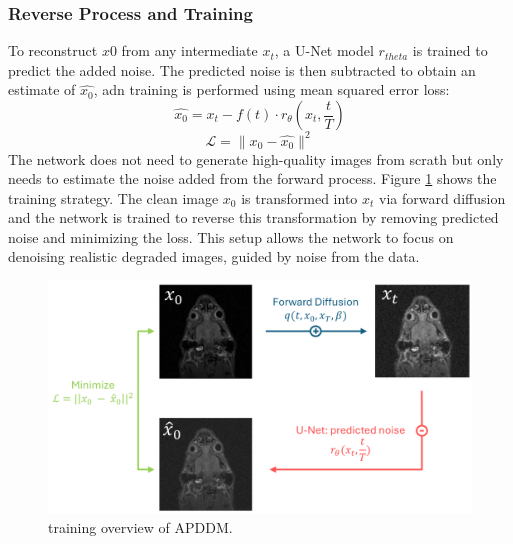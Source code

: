 \documentclass[twocolumn]{article}
\begin{document}
\subsubsection{Reverse Process and Training}
To reconstruct $x0$ from any intermediate $x_t$, a U-Net model $r_{theta}$ is trained to predict the added noise. 
The predicted noise is then subtracted to obtain an estimate of $\hat{x_0}$, adn training is performed using mean squared error loss: 
\begin{equation}\label{eq:Markov chain}
    \hat{x_0}=x_t-f(t) \cdot r_{\theta}(x_t,\frac{t}{T})
\end{equation}
\begin{equation}
    \mathcal{L}=\|x_0-\hat{x_0}\|^2
\end{equation}
The network does not need to generate high-quality images from scrath but only needs to estimate the noise added from the forward process. 
Figure \ref{fig:APDDM} shows the training strategy. The clean image $x_0$ is transformed into $x_t$ via forward diffusion and the network is trained to reverse this transformation by removing predicted noise and minimizing the loss. 
This setup allows the network to focus on denoising realistic degraded images, guided by noise from the data.

\begin{figure}[H]
    \centering
    \includegraphics[width=1\linewidth]{full APDDM .png}
    \caption{training overview of APDDM.}
    \label{fig:APDDM}
\end{figure}
\end{document}
